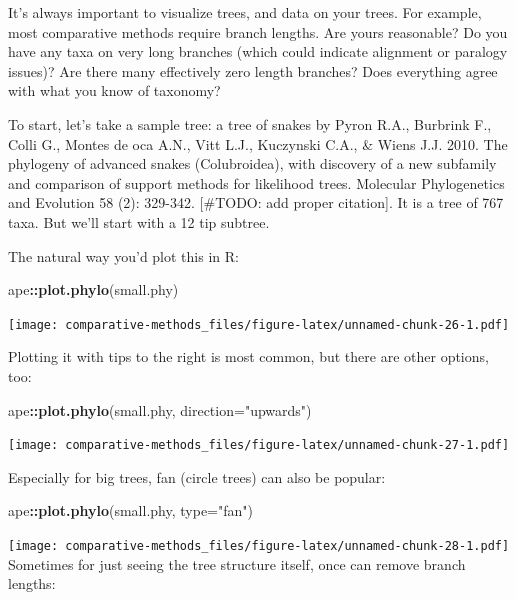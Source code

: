 \documentclass[]{article}
\newenvironment{Shaded}{\begin{snugshade}}{\end{snugshade}}
\newcommand{\DataTypeTok}[1]{\textcolor[rgb]{0.13,0.29,0.53}{#1}}
\newcommand{\KeywordTok}[1]{\textcolor[rgb]{0.13,0.29,0.53}{\textbf{#1}}}
\newcommand{\NormalTok}[1]{#1}
\newcommand{\OperatorTok}[1]{\textcolor[rgb]{0.81,0.36,0.00}{\textbf{#1}}}
\newcommand{\StringTok}[1]{\textcolor[rgb]{0.31,0.60,0.02}{#1}}
\theoremstyle{definition}
\theoremstyle{definition}
\theoremstyle{definition}
\theoremstyle{remark}
\begin{document}
It's always important to visualize trees, and data on your trees. For
example, most comparative methods require branch lengths. Are yours
reasonable? Do you have any taxa on very long branches (which could
indicate alignment or paralogy issues)? Are there many effectively zero
length branches? Does everything agree with what you know of taxonomy?

To start, let's take a sample tree: a tree of snakes by Pyron R.A.,
Burbrink F., Colli G., Montes de oca A.N., Vitt L.J., Kuczynski C.A., \&
Wiens J.J. 2010. The phylogeny of advanced snakes (Colubroidea), with
discovery of a new subfamily and comparison of support methods for
likelihood trees. Molecular Phylogenetics and Evolution 58 (2): 329-342.
{[}\#TODO: add proper citation{]}. It is a tree of 767 taxa. But we'll
start with a 12 tip subtree.

The natural way you'd plot this in R:

\begin{Shaded}
\begin{Highlighting}[]
\NormalTok{ape}\OperatorTok{::}\KeywordTok{plot.phylo}\NormalTok{(small.phy)}
\end{Highlighting}
\end{Shaded}

\texttt{[image: comparative-methods\_files/figure-latex/unnamed-chunk-26-1.pdf]}

Plotting it with tips to the right is most common, but there are other
options, too:

\begin{Shaded}
\begin{Highlighting}[]
\NormalTok{ape}\OperatorTok{::}\KeywordTok{plot.phylo}\NormalTok{(small.phy, }\DataTypeTok{direction=}\StringTok{"upwards"}\NormalTok{)}
\end{Highlighting}
\end{Shaded}

\texttt{[image: comparative-methods\_files/figure-latex/unnamed-chunk-27-1.pdf]}

Especially for big trees, fan (circle trees) can also be popular:

\begin{Shaded}
\begin{Highlighting}[]
\NormalTok{ape}\OperatorTok{::}\KeywordTok{plot.phylo}\NormalTok{(small.phy, }\DataTypeTok{type=}\StringTok{"fan"}\NormalTok{)}
\end{Highlighting}
\end{Shaded}

\texttt{[image: comparative-methods\_files/figure-latex/unnamed-chunk-28-1.pdf]}
Sometimes for just seeing the tree structure itself, once can remove
branch lengths:
\end{document}
